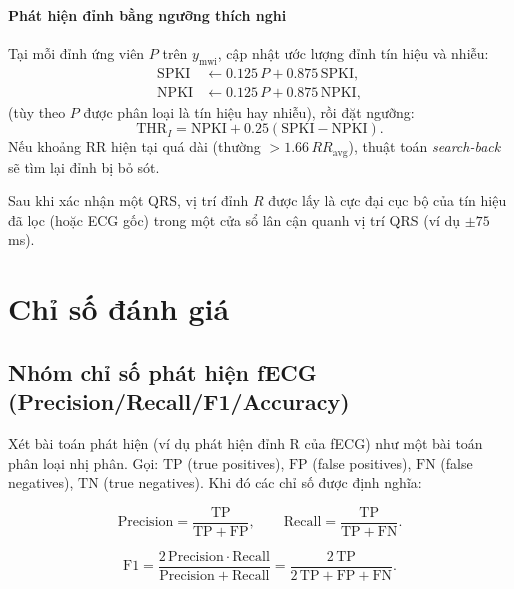 \documentclass[../DoAn.tex]{subfiles}
\begin{document}
\paragraph{Phát hiện đỉnh bằng ngưỡng thích nghi}

Tại mỗi đỉnh ứng viên $P$ trên $y_{\mathrm{mwi}}$, cập nhật ước lượng đỉnh tín hiệu và nhiễu:
\begin{align}
  \mathrm{SPKI} &\leftarrow 0.125\,P + 0.875\,\mathrm{SPKI},\\
  \mathrm{NPKI} &\leftarrow 0.125\,P + 0.875\,\mathrm{NPKI},
\end{align}
(tùy theo $P$ được phân loại là tín hiệu hay nhiễu), rồi đặt ngưỡng:
\begin{equation}
  \mathrm{THR}_I = \mathrm{NPKI} + 0.25\left(\mathrm{SPKI}-\mathrm{NPKI}\right).
\end{equation}
Nếu khoảng RR hiện tại quá dài (thường $>1.66\,RR_{\mathrm{avg}}$), thuật toán \textit{search-back} sẽ tìm lại đỉnh bị bỏ sót.

Sau khi xác nhận một QRS, vị trí đỉnh $R$ được lấy là cực đại cục bộ của tín hiệu đã lọc (hoặc ECG gốc) trong một cửa sổ lân cận quanh vị trí QRS (ví dụ $\pm 75$ ms).

\section{Chỉ số đánh giá}
\subsection{Nhóm chỉ số phát hiện fECG (Precision/Recall/F1/Accuracy)}
Xét bài toán phát hiện (ví dụ phát hiện đỉnh R của fECG) như một bài toán phân loại nhị phân. Gọi:
$\mathrm{TP}$ (true positives), $\mathrm{FP}$ (false positives),
$\mathrm{FN}$ (false negatives), $\mathrm{TN}$ (true negatives).
Khi đó các chỉ số được định nghĩa:

\begin{equation}
\mathrm{Precision} = \frac{\mathrm{TP}}{\mathrm{TP}+\mathrm{FP}},
\qquad
\mathrm{Recall} = \frac{\mathrm{TP}}{\mathrm{TP}+\mathrm{FN}}.
\end{equation}

\begin{equation}
\mathrm{F1} = \frac{2\,\mathrm{Precision}\cdot \mathrm{Recall}}{\mathrm{Precision}+\mathrm{Recall}}
           = \frac{2\,\mathrm{TP}}{2\,\mathrm{TP}+\mathrm{FP}+\mathrm{FN}}.
\end{equation}
\end{document}
